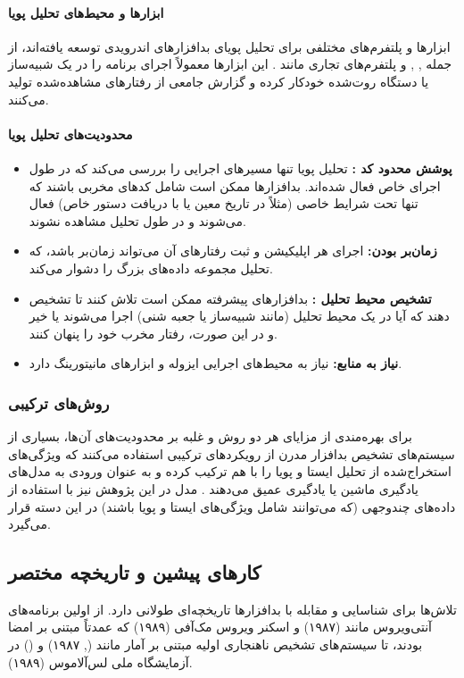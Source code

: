 \paragraph{ابزارها و محیط‌های تحلیل پویا}
ابزارها و پلتفرم‌های مختلفی برای تحلیل پویای بدافزارهای اندرویدی توسعه یافته‌اند، از جمله , ,  و پلتفرم‌های تجاری مانند . این ابزارها معمولاً اجرای برنامه را در یک شبیه‌ساز یا دستگاه روت‌شده خودکار کرده و گزارش جامعی از رفتارهای مشاهده‌شده تولید می‌کنند.

\paragraph{محدودیت‌های تحلیل پویا}
\begin{itemize}
    \item \textbf{پوشش محدود کد :} تحلیل پویا تنها مسیرهای اجرایی را بررسی می‌کند که در طول اجرای خاص فعال شده‌اند. بدافزارها ممکن است شامل کدهای مخربی باشند که تنها تحت شرایط خاصی (مثلاً در تاریخ معین یا با دریافت دستور خاص) فعال می‌شوند و در طول تحلیل مشاهده نشوند.
    \item \textbf{زمان‌بر بودن:} اجرای هر اپلیکیشن و ثبت رفتارهای آن می‌تواند زمان‌بر باشد، که تحلیل مجموعه داده‌های بزرگ را دشوار می‌کند.
    \item \textbf{تشخیص محیط تحلیل :} بدافزارهای پیشرفته ممکن است تلاش کنند تا تشخیص دهند که آیا در یک محیط تحلیل (مانند شبیه‌ساز یا جعبه شنی) اجرا می‌شوند یا خیر و در این صورت، رفتار مخرب خود را پنهان کنند.
    \item \textbf{نیاز به منابع:} نیاز به محیط‌های اجرایی ایزوله و ابزارهای مانیتورینگ دارد.
\end{itemize}

\subsubsection{روش‌های ترکیبی }
برای بهره‌مندی از مزایای هر دو روش و غلبه بر محدودیت‌های آن‌ها، بسیاری از سیستم‌های تشخیص بدافزار مدرن از رویکردهای ترکیبی استفاده می‌کنند که ویژگی‌های استخراج‌شده از تحلیل ایستا و پویا را با هم ترکیب کرده و به عنوان ورودی به مدل‌های یادگیری ماشین یا یادگیری عمیق می‌دهند \cite{DeepLearningMalware}. مدل  در این پژوهش نیز با استفاده از داده‌های چندوجهی (که می‌توانند شامل ویژگی‌های ایستا و پویا باشند) در این دسته قرار می‌گیرد.

\subsection{کارهای پیشین و تاریخچه مختصر}
تلاش‌ها برای شناسایی و مقابله با بدافزارها تاریخچه‌ای طولانی دارد. از اولین برنامه‌های آنتی‌ویروس مانند  (۱۹۸۷) و اسکنر ویروس مک‌آفی (۱۹۸۹) که عمدتاً مبتنی بر امضا بودند، تا سیستم‌های تشخیص ناهنجاری اولیه مبتنی بر آمار مانند  (, ۱۹۸۷) و  () در آزمایشگاه ملی لس‌آلاموس (۱۹۸۹).

